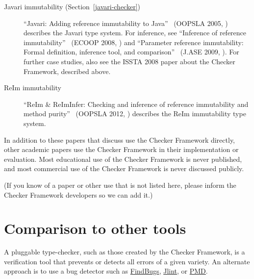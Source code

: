 \begin{description}
\item[Javari immutability (Section~\ref{javari-checker})]
``Javari: Adding reference immutability to Java''~\cite{TschantzE2005} (OOPSLA 2005, )
            describes the Javari type system.
For inference, see
``Inference of reference immutability''~\cite{QuinonezTE2008} (ECOOP 2008, )
and
``Parameter reference immutability: Formal definition, inference tool, and comparison''~\cite{ArtziQKE2009} (J.ASE 2009, ).
For further case studies, also see the ISSTA 2008 paper about the Checker
Framework, described above.

\item[ReIm immutability]
``ReIm \& ReImInfer: Checking and inference of reference immutability and method purity''~\cite{HuangMDE2012} (OOPSLA 2012, )
            describes the ReIm immutability type system.

\end{description}

In addition to these papers that discuss use the Checker Framework
directly, other academic papers use the Checker Framework in their
implementation or evaluation.
Most educational use of the Checker
Framework is never published, and most commercial use of the Checker
Framework is never discussed publicly.

(If you know of a paper or other use that is not listed here, please inform
the Checker Framework developers so we can add it.)


\section{Comparison to other tools\label{other-tools}}

A pluggable type-checker, such as those created by the Checker Framework,
is a verification tool that prevents or detects all errors of a given variety.  An
alternate approach is to use a bug detector such as
\href{http://findbugs.sourceforge.net/}{FindBugs},
\href{http://jlint.sourceforge.net/}{Jlint}, or
\href{http://pmd.sourceforge.net/}{PMD}.

